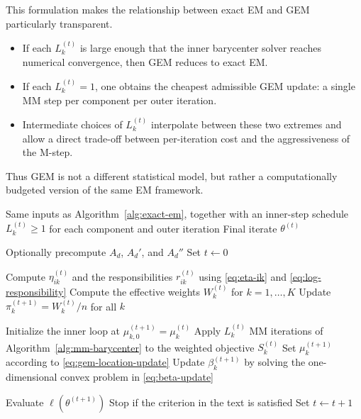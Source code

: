 \documentclass[11pt]{article}
\begin{document}
This formulation makes the relationship between exact EM and GEM particularly transparent.
\begin{itemize}[leftmargin=2.1em]
    \item If each \(L_k^{(t)}\) is large enough that the inner barycenter solver reaches numerical convergence, then GEM reduces to exact EM.
    \item If each \(L_k^{(t)}=1\), one obtains the cheapest admissible GEM update: a single MM step per component per outer iteration.
    \item Intermediate choices of \(L_k^{(t)}\) interpolate between these two extremes and allow a direct trade-off between per-iteration cost and the aggressiveness of the M-step.
\end{itemize}
Thus GEM is not a different statistical model, but rather a computationally budgeted version of the same EM framework.

\begin{algorithm}[t]
\caption{Generalized EM with truncated MM barycenter updates}
\label{alg:gem}
\begin{algorithmic}[1]
\REQUIRE Same inputs as Algorithm~\ref{alg:exact-em}, together with an inner-step schedule \(L_k^{(t)}\ge 1\) for each component and outer iteration
\ENSURE Final iterate \(\theta^{(t)}\)

\STATE Optionally precompute \(A_d\), \(A_d'\), and \(A_d''\)
\STATE Set \(t\gets 0\)

    \STATE Compute \(\eta_{ik}^{(t)}\) and the responsibilities \(r_{ik}^{(t)}\) using \eqref{eq:eta-ik} and \eqref{eq:log-responsibility}
    \STATE Compute the effective weights \(W_k^{(t)}\) for \(k=1,\ldots,K\)
    \STATE Update \(\pi_k^{(t+1)}=W_k^{(t)}/n\) for all \(k\)

        \STATE Initialize the inner loop at \(\mu_{k,0}^{(t+1)}=\mu_k^{(t)}\)
        \STATE Apply \(L_k^{(t)}\) MM iterations of Algorithm~\ref{alg:mm-barycenter} to the weighted objective \(S_k^{(t)}\)
        \STATE Set \(\mu_k^{(t+1)}\) according to \eqref{eq:gem-location-update}
        \STATE Update \(\beta_k^{(t+1)}\) by solving the one-dimensional convex problem in \eqref{eq:beta-update}
    \ENDFOR

    \STATE Evaluate \(\ell(\theta^{(t+1)})\)
    \STATE Stop if the criterion in the text is satisfied
    \STATE Set \(t\gets t+1\)
\ENDWHILE

\end{algorithmic}
\end{algorithm}
\end{document}
